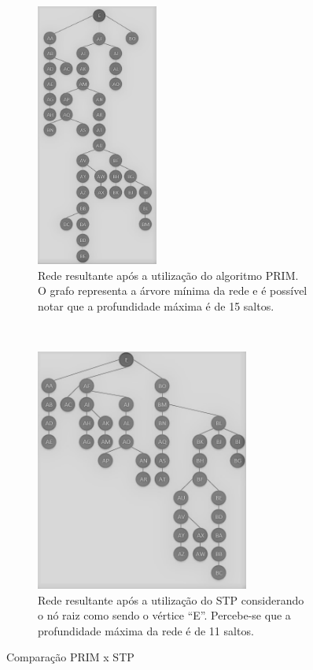 \documentclass[12pt]{article}
\begin{document}

\begin{figure}[t!]
	\centering
	\begin{subfigure}[t]{0.4\textwidth}
		\centering
		\includegraphics[width=4cm]{Otimizada_Prim_PB} %
		\caption{Rede resultante após a utilização do algoritmo PRIM. O grafo representa a árvore mínima da rede e é possível notar que a profundidade máxima é de 15 saltos.}
		\label{fig_rede_otimizada_prim}
	\end{subfigure}%
	~
	\begin{subfigure}[t]{0.5\textwidth}
		\centering
		\includegraphics[width=7cm]{Otimizada_STP_PB} %
	\caption{Rede resultante após a utilização do STP considerando o nó raiz como sendo o vértice ``E''. Percebe-se que a profundidade máxima da rede é de 11 saltos.}
	\label{fig_rede_otimizada_STP}
	\end{subfigure}
	\caption{Comparação PRIM x STP}
	\label{fig_redes_otimizadas_classico}
\end{figure}
\end{document}
